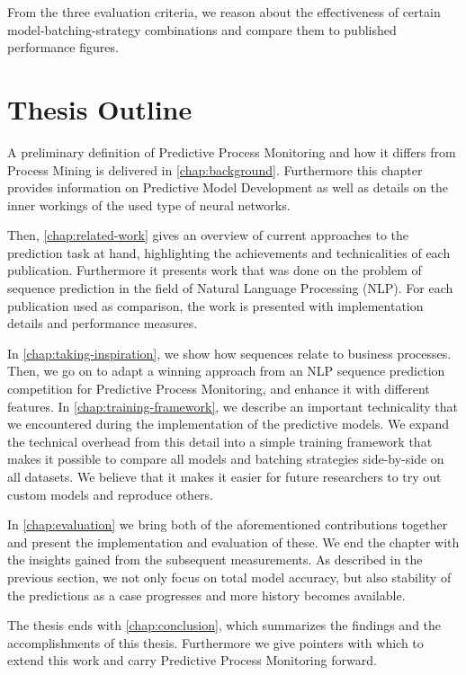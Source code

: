 From the three evaluation criteria, we reason about the effectiveness of certain model-batching-strategy combinations and compare them to published performance figures.

\section{Thesis Outline}\label{sec:intro:outline}
A preliminary definition of Predictive Process Monitoring and how it differs from Process Mining is delivered in \autoref{chap:background}. Furthermore this chapter provides information on Predictive Model Development as well as details on the inner workings of the used type of neural networks.

Then, \autoref{chap:related-work} gives an overview of current approaches to the prediction task at hand, highlighting the achievements and technicalities of each publication. Furthermore it presents work that was done on the problem of sequence prediction in the field of Natural Language Processing (NLP). For each publication used as comparison, the work is presented with implementation details and performance measures.

In \autoref{chap:taking-inspiration}, we show how sequences relate to business processes. Then, we go on to adapt a winning approach from an NLP sequence prediction competition for Predictive Process Monitoring, and enhance it with different features. In \autoref{chap:training-framework}, we describe an important technicality that we encountered during the implementation of the predictive models. We expand the technical overhead from this detail into a simple training framework that makes it possible to compare all models and batching strategies side-by-side on all datasets. We believe that it makes it easier for future researchers to try out custom models and reproduce others.

In \autoref{chap:evaluation} we bring both of the aforementioned contributions together and present the implementation and evaluation of these. We end the chapter with the insights gained from the subsequent measurements. As described in the previous section, we not only focus on total model accuracy, but also stability of the predictions as a case progresses and more history becomes available.

The thesis ends with \autoref{chap:conclusion}, which summarizes the findings and the accomplishments of this thesis. Furthermore we give pointers with which to extend this work and carry Predictive Process Monitoring forward.
